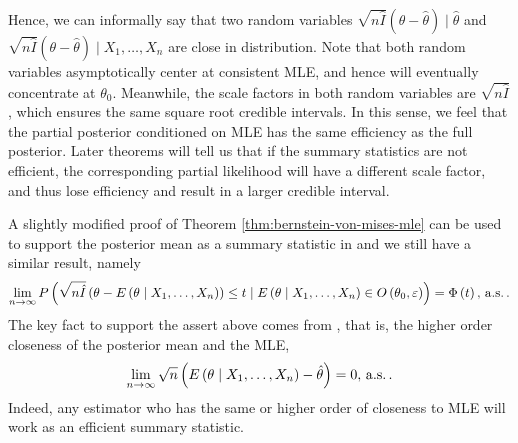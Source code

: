Hence, we can informally say that two random variables $\sqrt{n\hat{I}}\left(\theta-\hat{\theta}\right)\mid\hat{\theta}$
and $\sqrt{n\hat{I}}\left(\theta-\hat{\theta}\right)\mid X_{1},\ldots,X_{n}$
are close in distribution. Note that both random variables asymptotically
center at consistent MLE, and hence will eventually concentrate at
$\theta_{0}$. Meanwhile, the scale factors in both random variables
are $\sqrt{n\hat{I}}$, which {ensures
} the same square root credible  {intervals}.
In this sense, we feel that the partial posterior conditioned on MLE
has the same efficiency as the full posterior. Later theorems will
tell us that if the summary statistics are not efficient, the corresponding
partial likelihood will have a different scale factor, and thus lose
efficiency and result in a larger credible interval. 

A slightly modified proof of Theorem \ref{thm:bernstein-von-mises-mle}
can be used to support the posterior mean as a summary statistic in
\citet{fearnhead2012constructing} and we still have a similar result,
namely 
\[
\lim_{n\rightarrow\infty}P\left(\sqrt{n\hat{I}}\left(\theta-E\left(\theta\mid X_{1},\ldots,X_{n}\right)\right)\le t\mid E\left(\theta\mid X_{1},\ldots,X_{n}\right)\in O\left(\theta_{0},\varepsilon\right)\right)=\Phi\left(t\right),\,\mathrm{a.s.}\,.
\]
The key fact to support the assert above comes from \citet{ghosh2011moment},
that is, the higher order closeness of the posterior mean and the
MLE, 
\begin{equation}
\lim_{n\rightarrow\infty}\sqrt{n}\left(E\left(\theta\mid X_{1},\ldots,X_{n}\right)-\hat{\theta}\right)=0,\,\mathrm{a.s.}\,.\label{eq:high-order-close-post-mean-mle}
\end{equation}
Indeed, any estimator who has the same or higher order of closeness
to MLE will work as an efficient summary statistic.


